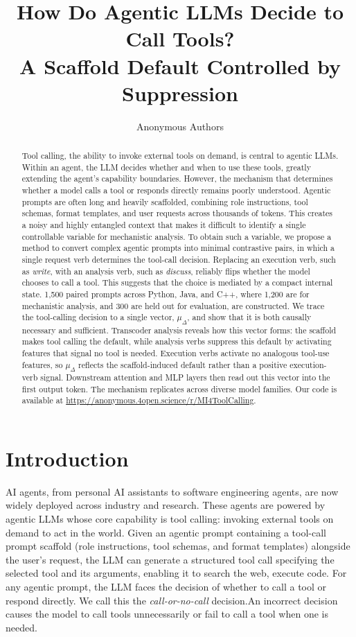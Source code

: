 \documentclass{article}
\title{How Do Agentic LLMs Decide to Call Tools?\\A Scaffold Default Controlled by Suppression}
\author{
Anonymous Authors
}
\begin{document}
\maketitle

\begin{abstract}
Tool calling, the ability to invoke external tools on demand, is central to agentic LLMs.
Within an agent, the LLM decides whether and when to use these tools, greatly extending the agent’s capability boundaries.
However, the mechanism that determines whether a model calls a tool or responds directly remains poorly understood.
Agentic prompts are often long and heavily scaffolded, combining role instructions, tool schemas, format templates, and user requests across thousands of tokens. This creates a noisy and highly entangled context that makes it difficult to identify a single controllable variable for mechanistic analysis.
To obtain such a variable, we propose a method to convert complex agentic prompts into minimal contrastive pairs, in which a single request verb determines the tool-call decision. Replacing an execution verb, such as \textit{write}, with an analysis verb, such as \textit{discuss}, reliably flips whether the model chooses to call a tool. This suggests that the choice is mediated by a compact internal state.
1,500 paired prompts across Python, Java, and C++, where 1,200 are for mechanistic analysis, and 300 are held out for evaluation, are constructed.
We trace the tool-calling decision to a single vector, $\mu_\Delta$, and show that it is both causally necessary and sufficient.
Transcoder analysis reveals how this vector forms: the scaffold makes tool calling the default, while analysis verbs suppress this default by activating features that signal no tool is needed. Execution verbs activate no analogous tool-use features, so $\mu_\Delta$ reflects the scaffold-induced default rather than a positive execution-verb signal. Downstream attention and MLP layers then read out this vector into the first output token. The mechanism replicates across diverse model families.
Our code is available at \url{https://anonymous.4open.science/r/MI4ToolCalling}.
\end{abstract} 

\section{Introduction}

AI agents, from personal AI assistants to software engineering agents, are now widely deployed across industry and research. 
These agents are powered by agentic LLMs whose core capability is tool calling: invoking external tools on demand to act in the world.
Given an agentic prompt containing a tool-call prompt scaffold (role instructions, tool schemas, and format templates) alongside the user's request, the LLM can generate a structured tool call specifying the selected tool and its arguments, enabling it to search the web, execute code\cite{schick2023toolformer, yao2023react}. 
For any agentic prompt, the LLM faces the decision of whether to call a tool or respond directly.
We call this the \emph{call-or-no-call} decision.An incorrect decision causes the model to call tools unnecessarily or fail to call a tool when one is needed.
\end{document}
